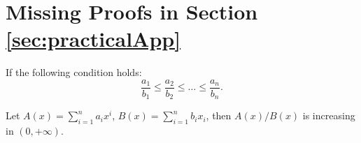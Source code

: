 


\section{Missing Proofs in Section \ref{sec:practicalApp}}
\begin{lemma}\label{lem:IncFracSeq}
    If the following condition holds:
    \[
    \frac{a_1}{b_1} \leq \frac{a_2}{b_2} \leq \ldots \leq \frac{a_n}{b_n}.
    \]
    
    Let $A(x) = \sum_{i=1}^na_ix^{i}$, $B(x)=\sum_{i=1}^n b_ix_i$, then $A(x)/B(x)$ is increasing in $(0,+\infty)$. 
\end{lemma}

